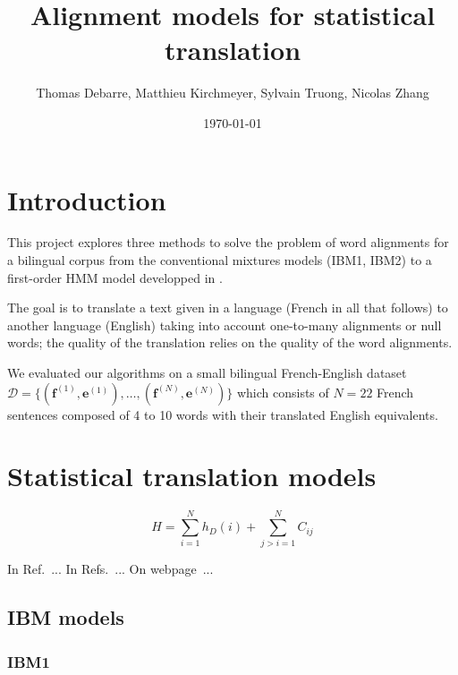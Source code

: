 \documentclass[final]{beamer}
\title
[Probabilistic Graphical Models Poster Session, Wed 4 Jan 2017] %
{ %
Alignment models for statistical translation
}
\author{ %
Thomas Debarre, Matthieu Kirchmeyer, Sylvain Truong, Nicolas Zhang
}
\institute
{\mbox{}
}
\date{\today}
\begin{document}
\begin{frame}[t]
\begin{multicols}{3}

\section{Introduction}

This project explores three methods to solve the problem of word alignments for a bilingual corpus from the conventional mixtures models (IBM1, IBM2) to a first-order HMM model developped in \cite{ref1}. 

The goal is to translate a text given in a language (French in all that follows) to another language (English) taking into account one-to-many alignments or null words; the quality of the translation relies on the quality of the word alignments.

We evaluated our algorithms on a small bilingual French-English dataset $\mathcal{D} = \{ (\mathbf{f}^{(1)},\mathbf{e}^{(1)}), \dots , (\mathbf{f}^{(N)},\mathbf{e}^{(N)})\}$ which consists of $N = 22$ French sentences composed of 4 to 10 words with their translated English equivalents. 

\section{Statistical translation models}



\begin{equation}
H = \sum_{i=1}^{N} h_{D}(i) + \sum_{j>i=1}^{N} C_{ij}
\end{equation}


In Ref.~\cite{ref1}...
In Refs.~\cite{ref1,ref2}...
On webpage~\cite{web}...

\subsection{IBM models}

\subsubsection{IBM1}



\end{multicols}
\end{frame}
\end{document}

